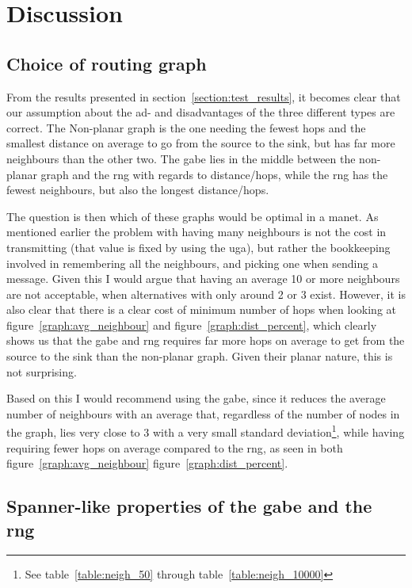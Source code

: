 \section{Discussion}
\label{section:discussion}

\subsection{Choice of routing graph}

From the results presented in section~\ref{section:test_results}, it becomes clear that our assumption about the ad- and disadvantages of the three different types are correct. The Non-planar graph is the one needing the fewest hops and the smallest distance on average to go from the source to the sink, but has far more neighbours than the other two. The \ac{gabe} lies in the middle between the non-planar graph and the \ac{rng} with regards to distance/hops, while the \ac{rng} has the fewest neighbours, but also the longest distance/hops. 

The question is then which of these graphs would be optimal in a \ac{manet}. As mentioned earlier the problem with having many neighbours is not the cost in transmitting (that value is fixed by using the \ac{uga}), but rather the bookkeeping involved in remembering all the neighbours, and picking one when sending a message. Given this I would argue that having an average 10 or more neighbours are not acceptable, when alternatives with only around 2 or 3 exist. However, it is also clear that there is a clear cost of minimum number of hops when looking at figure~\ref{graph:avg_neighbour} and figure~\ref{graph:dist_percent}, which clearly shows us that the \ac{gabe} and \ac{rng} requires far more hops on average to get from the source to the sink than the non-planar graph. Given their planar nature, this is not surprising. 

Based on this I would recommend using the \ac{gabe}, since it reduces the average number of neighbours with an average that, regardless of the number of nodes in the graph, lies very close to 3 with a very small standard deviation\footnote{See table~\ref{table:neigh_50} through table~\ref{table:neigh_10000}}, while having requiring fewer hops on average compared to the \ac{rng}, as seen in both figure~\ref{graph:avg_neighbour} figure~\ref{graph:dist_percent}.

\subsection{Spanner-like properties of the \ac{gabe} and the \ac{rng}}

